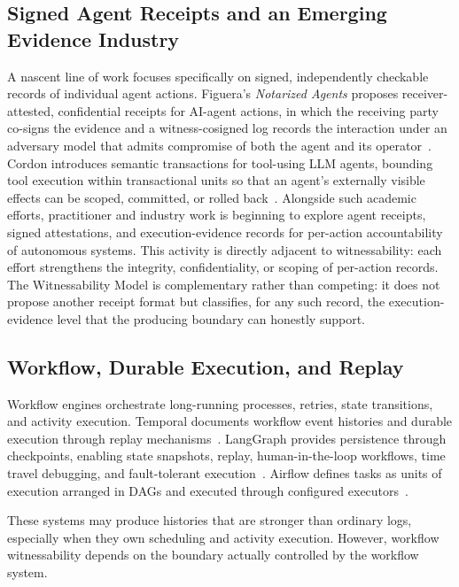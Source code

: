 \documentclass[11pt]{article}
\begin{document}
\subsection{Signed Agent Receipts and an Emerging Evidence Industry}
A nascent line of work focuses specifically on signed, independently checkable records of individual agent actions. Figuera's \emph{Notarized Agents} proposes receiver-attested, confidential receipts for AI-agent actions, in which the receiving party co-signs the evidence and a witness-cosigned log records the interaction under an adversary model that admits compromise of both the agent and its operator~\cite{figuera_notarized_agents_2026}. Cordon introduces semantic transactions for tool-using LLM agents, bounding tool execution within transactional units so that an agent's externally visible effects can be scoped, committed, or rolled back~\cite{cordon_semantic_transactions_2026}. Alongside such academic efforts, practitioner and industry work is beginning to explore agent receipts, signed attestations, and execution-evidence records for per-action accountability of autonomous systems. This activity is directly adjacent to witnessability: each effort strengthens the integrity, confidentiality, or scoping of per-action records. The Witnessability Model is complementary rather than competing: it does not propose another receipt format but classifies, for any such record, the execution-evidence level that the producing boundary can honestly support.

\subsection{Workflow, Durable Execution, and Replay}
Workflow engines orchestrate long-running processes, retries, state transitions, and activity execution. Temporal documents workflow event histories and durable execution through replay mechanisms~\cite{temporal_event_history,temporal_durable_execution}. LangGraph provides persistence through checkpoints, enabling state snapshots, replay, human-in-the-loop workflows, time travel debugging, and fault-tolerant execution~\cite{langgraph_persistence,langgraph_time_travel}. Airflow defines tasks as units of execution arranged in DAGs and executed through configured executors~\cite{airflow_tasks,airflow_executor}.

These systems may produce histories that are stronger than ordinary logs, especially when they own scheduling and activity execution. However, workflow witnessability depends on the boundary actually controlled by the workflow system.
\end{document}
